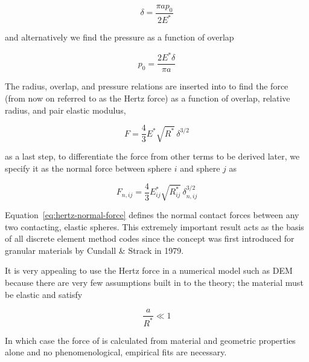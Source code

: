 \begin{equation}
	\delta = \frac{\pi a p_0}{2E^*}
\end{equation}

and alternatively we find the pressure as a function of overlap

\begin{equation}\label{eq:hertzian-pressure}
	p_0 = \frac{2E^*\delta}{\pi a}
\end{equation}

The radius, overlap, and pressure relations are inserted into  to find the force (from now on referred to as the Hertz force) as a function of overlap, relative radius, and pair elastic modulus,

\begin{equation}\label{eq:hertz-force}
	F = \frac{4}{3}E^* \sqrt{R^*} \, \delta^{3/2}
\end{equation}

as a last step, to differentiate the force from other terms to be derived later, we specify it as the normal force between sphere $i$ and sphere $j$ as

\begin{equation}\label{eq:hertz-normal-force}
	F_{n,ij} = \frac{4}{3}E_{ij}^* \sqrt{R_{ij}^*} \, \delta_{n,ij}^{3/2}
\end{equation}

Equation~\ref{eq:hertz-normal-force} defines the normal contact forces between any two contacting, elastic spheres. This extremely important result acts as the basis of all discrete element method codes since the concept was first introduced for granular materials by Cundall \& Strack in 1979\cite{Cundall1979}. 

It is very appealing to use the Hertz force in a numerical model such as DEM because there are very few assumptions built in to the theory; the material must be elastic and satisfy

\begin{equation}
	\frac{a}{R^*} \ll 1
\end{equation}

In which case the force of  is calculated from material and geometric properties alone and no phenomenological, empirical fits are necessary.



